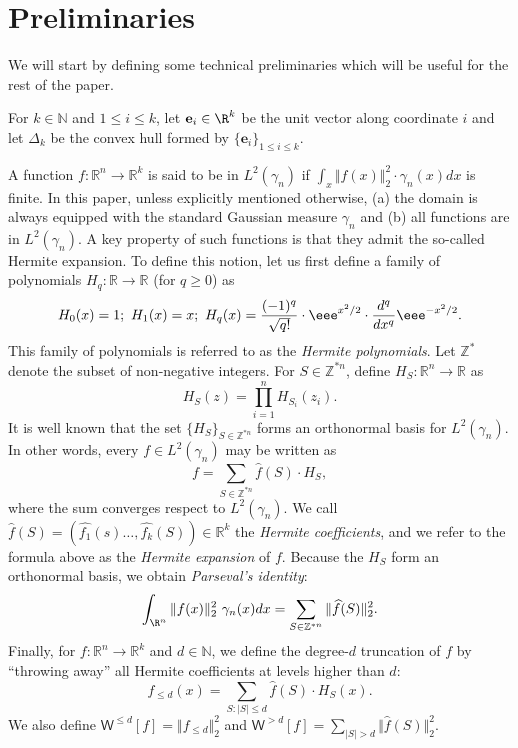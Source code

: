 \documentclass{toc}
\begin{document}
\section{Preliminaries} 
We will start by defining some technical preliminaries which will be useful for the rest of the paper. 
\begin{definition}
For $k \in \mathbb{N}$ and $1\le i \le k$, let $\mathbf{e}_i \in \R^k$ be the unit vector along coordinate $i$ and let $\Delta_k$ be the convex hull formed by $\{ \mathbf{e}_i \}_{1\le i \le k}$. 
\end{definition}
A function $f: \mathbb{R}^n \rightarrow \mathbb{R}^k$ is said to be in $L^2(\gamma_n)$ if $\int_x \Vert f(x)\Vert_2^2 \cdot \gamma_n(x) dx$ is finite.  In this paper, unless explicitly mentioned otherwise, (a) the domain is always equipped with the standard Gaussian measure $\gamma_n$ and (b) all functions are in $L^2(\gamma_n)$. 
 A key property of such functions is that they admit the so-called Hermite expansion. To define this notion, let us first define a family of polynomials $H_q: \mathbb{R} \rightarrow \mathbb{R}$ (for $q \ge 0$) as 
$$
H_0(x) = 1 ; \ H_1(x) = x ; \  H_q(x) = \frac{(-1)^q}{\sqrt{q!}}  \cdot \eee^{x^2/2}  \cdot \frac{d^q}{dx^q} \eee^{-x^2/2}. 
$$
This family of polynomials is referred to as the \emph{Hermite polynomials}. Let $\mathbb{Z}^{\ast}$ denote the subset of non-negative integers. For $S \in \mathbb{Z}^{\ast n}$, define $H_S: \mathbb{R}^n \rightarrow \mathbb{R}$ as
$$
H_S(z) = \prod_{i=1}^n H_{S_i}(z_i). 
$$
It is well known that the set $\{H_S\}_{S \in \mathbb{Z}^{\ast n}}$ forms an orthonormal basis for $L^2(\gamma_n)$. In other words, every $f \in L^2(\gamma_n)$
may be written as
$$
f = \sum_{S \in \mathbb{Z}^{\ast n}} \widehat{f}(S) \cdot H_S,
$$
where the sum converges respect to $L^2(\gamma_n)$. We call $\widehat{f}(S) = (\widehat{f_1}(s) \ldots, \widehat{f_k}(S)) \in
\mathbb{R}^k$ the \emph{Hermite coefficients}, and we refer to the formula above as the \emph{Hermite expansion} of $f$. 
Because the $H_S$ form an orthonormal basis, we obtain \emph{Parseval's identity}:
\begin{equation}\label{eq:parseval}
    \int_{\R^n} \Vert f (x) \Vert_2^2  \ \gamma_n(x) dx = \sum_{S \in \mathbb{Z}^{\ast n}} \Vert \widehat{f}(S) \Vert_2^2.
\end{equation}
Finally, for $f: \mathbb{R}^n \rightarrow \mathbb{R}^k$ and $d \in \mathbb{N}$, we define the degree-$d$ truncation of $f$ by ``throwing away''
all Hermite coefficients at levels higher than $d$:
$$
f_{\le d} (x) = \sum_{S: |S| \le d} \widehat{f}(S) \cdot H_S(x). 
$$
We also define $\mathsf{W}^{\le d} [f] = \Vert f_{\le d} \Vert_2^2$ and $\mathsf{W}^{> d} [f] = \sum_{|S|>d} \Vert \widehat{f}(S) \Vert_2^2$. 
\end{document}
